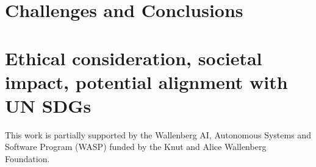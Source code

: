 \documentclass[12pt]{article}
\newcommand{\contentdescription}[1]{}
\begin{document}
    \section{Challenges and Conclusions}
    \contentdescription{
        Challenges and Conclusions (5-15\%):
        Challenges you faced when reimplementing the paper and conducting the experiments. Were all details in the paper? Or did you have to look in the authors code or even contact them to find about some details? Was parts of the code quite hard to get them to work as intended? Did you have optimize and tune several hyperparameters? Which ones? Did the framework you used make the implementation difficult in some ways?

        Summarize your key results - what have you learned? What points do you think one should consider when using the approach of the paper you chose for your project? Suggest ideas for future extensions or new applications of your ideas.
    }


    \section{Ethical consideration, societal impact, potential alignment with UN SDGs}
    \contentdescription{
        Ethical consideration, societal impact, potential alignment with UN SDGs (5-10\%): Think and research! Are there any ethical considerations for the original paper, its problem or method, its way of conducting experiments? How about your task, your datasets, and the experiments you did? What societal impact can you imagine about the original paper and its contributions and results? How about your project report? How do you think this paper can push the UN SDG targets?
    }

    \begin{ack}
        This work is partially supported by the Wallenberg AI, Autonomous Systems and Software Program (WASP) funded by the Knut and Alice Wallenberg Foundation.
    \end{ack}
\end{document}
